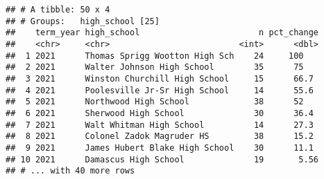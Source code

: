 \documentclass[]{article}
\newenvironment{Shaded}{\begin{snugshade}}{\end{snugshade}}
\newcommand{\CommentTok}[1]{\textcolor[rgb]{0.56,0.35,0.01}{\textit{#1}}}
\newcommand{\DataTypeTok}[1]{\textcolor[rgb]{0.13,0.29,0.53}{#1}}
\newcommand{\DecValTok}[1]{\textcolor[rgb]{0.00,0.00,0.81}{#1}}
\newcommand{\KeywordTok}[1]{\textcolor[rgb]{0.13,0.29,0.53}{\textbf{#1}}}
\newcommand{\NormalTok}[1]{#1}
\newcommand{\OperatorTok}[1]{\textcolor[rgb]{0.81,0.36,0.00}{\textbf{#1}}}
\newcommand{\OtherTok}[1]{\textcolor[rgb]{0.56,0.35,0.01}{#1}}
\newcommand{\StringTok}[1]{\textcolor[rgb]{0.31,0.60,0.02}{#1}}
\begin{document}
\begin{Shaded}
\end{Shaded}

\begin{verbatim}
## # A tibble: 50 x 4
## # Groups:   high_school [25]
##    term_year high_school                        n pct_change
##    <chr>     <chr>                          <int>      <dbl>
##  1 2021      Thomas Sprigg Wootton High Sch    24     100   
##  2 2021      Walter Johnson High School        35      75   
##  3 2021      Winston Churchill High School     15      66.7 
##  4 2021      Poolesville Jr-Sr High School     14      55.6 
##  5 2021      Northwood High School             38      52   
##  6 2021      Sherwood High School              30      36.4 
##  7 2021      Walt Whitman High School          14      27.3 
##  8 2021      Colonel Zadok Magruder HS         38      15.2 
##  9 2021      James Hubert Blake High School    30      11.1 
## 10 2021      Damascus High School              19       5.56
## # ... with 40 more rows
\end{verbatim}
\end{document}
